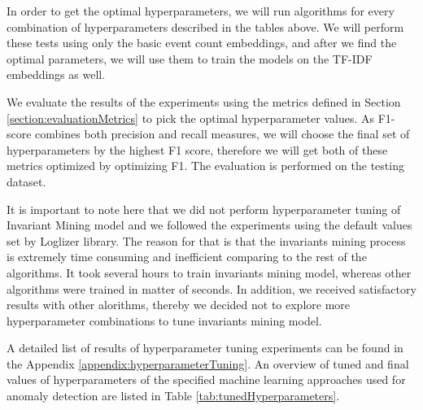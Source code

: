 
In order to get the optimal hyperparameters, we will run algorithms for every combination of hyperparameters described in the tables above. We will perform these tests using only the basic event count embeddings, and after we find the optimal parameters, we will use them to train the models on the TF-IDF embeddings as well. 

We evaluate the results of the experiments using the metrics defined in Section \ref{section:evaluationMetrics} to pick the optimal hyperparameter values. As F1-score combines both precision and recall measures, we will choose the final set of hyperparameters by the highest F1 score, therefore we will get both of these metrics optimized by optimizing F1. The evaluation is performed on the testing dataset. 

It is important to note here that we did not perform hyperparameter tuning of Invariant Mining model and we followed the experiments using the default values set by Loglizer library. The reason for that is that the invariants mining process is extremely time consuming and inefficient comparing to the rest of the algorithms. It took several hours to train invariants mining model, whereas other algorithms were trained in matter of seconds. In addition, we received satisfactory results with other alorithms, thereby we decided not to explore more hyperparameter combinations to tune invariants mining model. 

A detailed list of results of hyperparameter tuning experiments can be found in the Appendix \ref{appendix:hyperparameterTuning}. An overview of tuned and final values of hyperparameters of the specified machine learning approaches used for anomaly detection are listed in Table \ref{tab:tunedHyperparameters}. 

